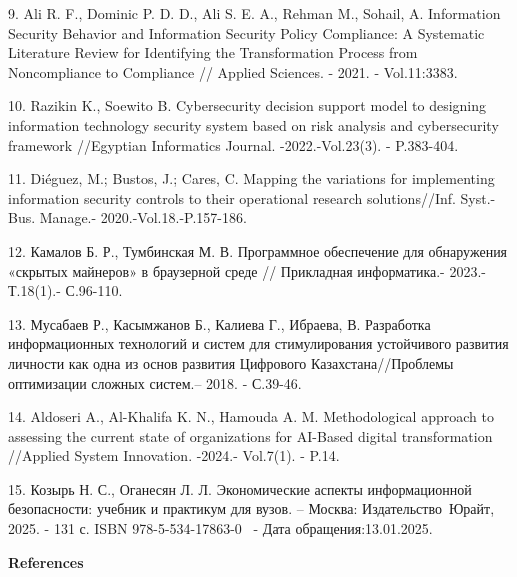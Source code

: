 \begin{references}
9. Ali R. F., Dominic P. D. D., Ali S. E. A., Rehman M., Sohail, A.
Information Security Behavior and Information Security Policy
Compliance: A Systematic Literature Review for Identifying the
Transformation Process from Noncompliance to Compliance // Applied
Sciences. - 2021. - Vol.11:3383.
\href{https://doi.org/10.3390/app11083383}{}

10. Razikin K., Soewito B. Cybersecurity decision support model to
designing information technology security system based on risk analysis
and cybersecurity framework //Egyptian Informatics Journal.
-2022.-Vol.23(3). - P.383-404.
\href{https://doi.org/10.1016/j.eij.2022.03.001}{}

11. Diéguez, M.; Bustos, J.; Cares, C. Mapping the variations for
implementing information security controls to their operational research
solutions//Inf. Syst.-Bus. Manage.- 2020.-Vol.18.-P.157-186.
~\href{https://doi.org/10.1007/s10257-020-00470-8}{}

12. Камалов Б. Р., Тумбинская М. В. Программное обеспечение для
обнаружения «скрытых майнеров» в браузерной среде // Прикладная
информатика.- 2023.-Т.18(1).- С.96-110.
\href{\%20https:/doi.org/10.37791/2687-0649-2023-18-1-96-110}{}

13. Мусабаев Р., Касымжанов Б., Калиева Г., Ибраева, В. Разработка
информационных технологий и систем для стимулирования устойчивого
развития личности как одна из основ развития Цифрового
Казахстана//Проблемы оптимизации сложных систем.-- 2018. - С.39-46.

14. Aldoseri A., Al-Khalifa K. N., Hamouda A. M. Methodological approach
to assessing the current state of organizations for AI-Based digital
transformation //Applied System Innovation. -2024.- Vol.7(1). - P.14.
\href{https://doi.org/10.3390/asi7010014}{}

15. Козырь Н. С., Оганесян Л. Л. Экономические аспекты информационной
безопасности: учебник и практикум для вузов. -- Москва:
Издательство~Юрайт, 2025. - 131 с. ISBN 978-5-534-17863-0
\href{https://urait.ru/bcode/568708}{}~-
Дата обращения:13.01.2025.
\end{references}

\begin{center}
{\bfseries References}
\end{center}

